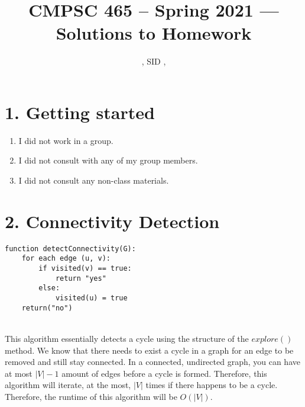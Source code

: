 \documentclass[11pt]{article}
\title{CMPSC 465 -- Spring 2021 --- Solutions to Homework \Homework}
\author{\Name, SID \SID, \texttt{\Login}}
\newenvironment{qparts}{\begin{enumerate}[{(}a{)}]}{\end{enumerate}}
\begin{document}
\maketitle


\section*{1. Getting started}
\begin{qparts}
\item
I did not work in a group.
\item
I did not consult with any of my group members.
\item
I did not consult any non-class materials.
\end{qparts}



\newpage
\section*{2. Connectivity Detection}

\begin{lstlisting}
function detectConnectivity(G):
	for each edge (u, v):
		if visited(v) == true:
			return "yes"
		else: 
			visited(u) = true
	return("no")
\end{lstlisting}\\
This algorithm essentially detects a cycle using the structure of the $explore()$ method. We know that there needs to exist a cycle in a graph for an edge to be removed and still stay connected. In a connected, undirected graph, you can have at most $|V|-1$ amount of edges before a cycle is formed. Therefore, this algorithm will iterate, at the most, $|V|$ times if there happens to be a cycle. Therefore, the runtime of this algorithm will be $O(|V|)$.


\newpage
\end{document}
